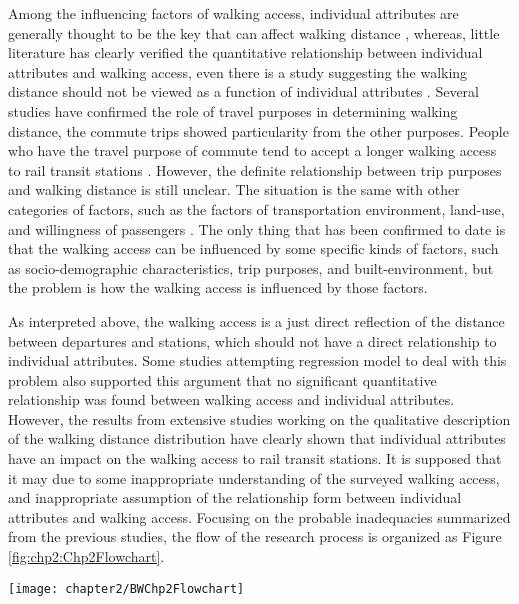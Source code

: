 %
Among the influencing factors of walking access, individual attributes are generally thought to be the key that can affect walking distance \cite{besser2005walking,weinstein2008far,krygsman2004multimodal,yang2012walking,daniels2013explaining,guerra2012half}, whereas, little literature has clearly verified the quantitative relationship between individual attributes and walking access, even there is a study suggesting the walking distance should not be viewed as a function of individual attributes \cite{krygsman2004multimodal}. Several studies have confirmed the role of travel purposes in determining walking distance, the commute trips showed particularity from the other purposes. People who have the travel purpose of commute tend to accept a longer walking access to rail transit stations \cite{larsen2010beyond}. However, the definite relationship between trip purposes and walking distance is still unclear. The situation is the same with other categories of factors, such as the factors of transportation environment, land-use, and willingness of passengers \cite{guerra2012half,krygsman2004multimodal,weinstein2008far}. The only thing that has been confirmed to date is that the walking access can be influenced by some specific kinds of factors, such as socio-demographic characteristics, trip purposes, and built-environment, but the problem is how the walking access is influenced by those factors. 

As interpreted above, the walking access is a just direct reflection of the distance between departures and stations, which should not have a direct relationship to individual attributes. Some studies attempting regression model to deal with this problem also supported this argument that no significant quantitative relationship was found between walking access and individual attributes. However, the results from extensive studies working on the qualitative description of the walking distance distribution have clearly shown that individual attributes have an impact on the walking access to rail transit stations. It is supposed that it may due to some inappropriate understanding of the surveyed walking access, and inappropriate assumption of the relationship form between individual attributes and walking access. Focusing on the probable inadequacies summarized from the previous studies, the flow of the research process is organized as Figure \ref{fig:chp2:Chp2Flowchart}.

\begin{sidewaysfigure}[htbp]
	\centering
	\texttt{[image: chapter2/BWChp2Flowchart]}
	\caption{Research flowchart}
	\label{fig:chp2:Chp2Flowchart}
\end{sidewaysfigure}

